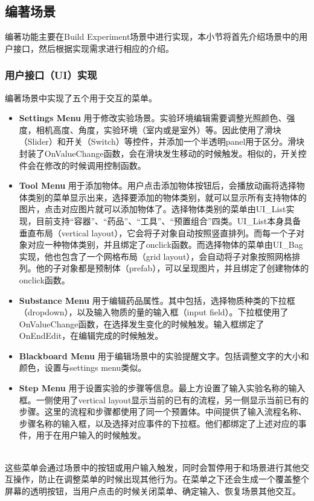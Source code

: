 \subsection{编著场景}
编著功能主要在Build Experiment场景中进行实现，本小节将首先介绍场景中的用户接口，然后根据实现需求进行相应的介绍。

\subsubsection{用户接口（UI）实现}
编著场景中实现了五个用于交互的菜单。

\begin{itemize}
    \item \textbf{Settings Menu}
用于修改实验场景。实验环境编辑需要调整光照颜色、强度，相机高度、角度，实验环境（室内或是室外）等。因此使用了滑块（Slider）和开关（Switch）等控件，并添加一个半透明panel用于区分。滑块封装了OnValueChange函数，会在滑块发生移动的时候触发。相似的，开关控件会在修改的时候调用控制函数。
    
    \item \textbf{Tool Menu}
用于添加物体。用户点击添加物体按钮后，会播放动画将选择物体类别的菜单显示出来，选择要添加的物体类别，就可以显示所有支持物体的图片，点击对应图片就可以添加物体了。选择物体类别的菜单由UI\_List实现，目前支持“容器”、“药品”、“工具”、“预置组合”四类。UI\_List本身具备垂直布局（vertical layout），它会将子对象自动按照竖直排列。而每一个子对象对应一种物体类别，并且绑定了onclick函数。而选择物体的菜单由UI\_Bag实现，他也包含了一个网格布局（grid layout），会自动将子对象按照网格排列。他的子对象都是预制体（prefab），可以呈现图片，并且绑定了创建物体的onclick函数。
    
    \item \textbf{Substance Menu}
用于编辑药品属性。其中包括，选择物质种类的下拉框（dropdown），以及输入物质的量的输入框（input field）。下拉框使用了OnValueChange函数，在选择发生变化的时候触发。输入框绑定了OnEndEdit，在编辑完成的时候触发。

    \item \textbf{Blackboard Menu}
用于编辑场景中的实验提醒文字。包括调整文字的大小和颜色，设置与settings menu类似。
    
    \item \textbf{Step Menu}
用于设置实验的步骤等信息。最上方设置了输入实验名称的输入框。一侧使用了vertical layout显示当前的已有的流程，另一侧显示当前已有的步骤。这里的流程和步骤都使用了同一个预置体。中间提供了输入流程名称、步骤名称的输入框，以及选择对应事件的下拉框。他们都绑定了上述对应的事件，用于在用户输入的时候触发。
\end{itemize}
~\\
\indent    	这些菜单会通过场景中的按钮或用户输入触发，同时会暂停用于和场景进行其他交互操作，防止在调整菜单的时候出现其他行为。在菜单之下还会生成一个覆盖整个屏幕的透明按钮，当用户点击的时候关闭菜单、确定输入、恢复场景其他交互。

